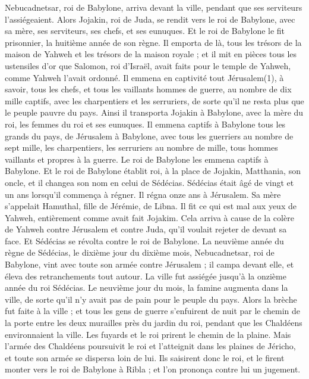 \begin{multicols}{2}
Nebucadnetsar, roi de Babylone, arriva devant la ville, pendant que ses serviteurs l’assiégeaient.
Alors Jojakin, roi de Juda, se rendit vers le roi de Babylone, avec sa mère, ses serviteurs, ses chefs, et ses eunuques. Et le roi de Babylone le fit prisonnier, la huitième année de son règne.
Il emporta de là, tous les trésors de la maison de Yahweh et les trésors de la maison royale ; et il mit en pièces tous les ustensiles d’or que Salomon, roi d’Israël, avait faits pour le temple de Yahweh, comme Yahweh l’avait ordonné.
Il emmena en captivité tout Jérusalem(1), à savoir, tous les chefs, et tous les vaillants hommes de guerre, au nombre de dix mille captifs, avec les charpentiers et les serruriers, de sorte qu’il ne resta plus que le peuple pauvre du pays.
Ainsi il transporta Jojakin à Babylone, avec la mère du roi, les femmes du roi et ses eunuques. Il emmena captifs à Babylone tous les grands du pays, de Jérusalem à Babylone,
avec tous les guerriers au nombre de sept mille, les charpentiers, les serruriers au nombre de mille, tous hommes vaillants et propres à la guerre. Le roi de Babylone les emmena captifs à Babylone.
Et le roi de Babylone établit roi, à la place de Jojakin, Matthania, son oncle, et il changea son nom en celui de Sédécias.
Sédécias était âgé de vingt et un ans lorsqu’il commença à régner. Il régna onze ans à Jérusalem. Sa mère s’appelait Hamuthal, fille de Jérémie, de Libna.
Il fit ce qui est mal aux yeux de Yahweh, entièrement comme avait fait Jojakim.
Cela arriva à cause de la colère de Yahweh contre Jérusalem et contre Juda, qu’il voulait rejeter de devant sa face. Et Sédécias se révolta contre le roi de Babylone.
\VerseOne{}La neuvième année du règne de Sédécias, le dixième jour du dixième mois, Nebucadnetsar\FTNT{}, roi de Babylone, vint avec toute son armée contre Jérusalem ; il campa devant elle, et éleva des retranchements tout autour.
La ville fut assiégée jusqu’à la onzième année du roi Sédécias.
Le neuvième jour du mois, la famine\FTNT{} augmenta dans la ville, de sorte qu’il n’y avait pas de pain pour le peuple du pays.
Alors la brèche fut faite à la ville ; et tous les gens de guerre s’enfuirent de nuit par le chemin de la porte entre les deux murailles près du jardin du roi, pendant que les Chaldéens environnaient la ville. Les fuyards et le roi prirent le chemin de la plaine.
Mais l’armée des Chaldéens poursuivit le roi et l’atteignit dans les plaines de Jéricho, et toute son armée se dispersa loin de lui.
Ils saisirent donc le roi, et le firent monter vers le roi de Babylone à Ribla ; et l’on prononça contre lui un jugement.

\end{multicols}
